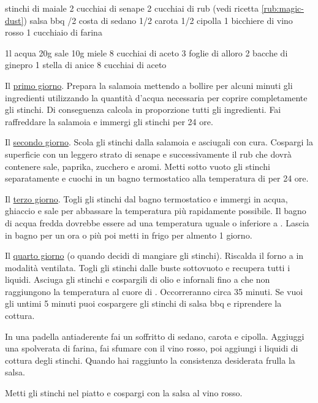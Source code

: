 \begin{ingreds}
	 stinchi di maiale
	2 cucchiai di senape
	2 cucchiai di rub (vedi ricetta \ref{rub:magic-dust})
	salsa bbq
	/2 costa di sedano
	1/2 carota
	1/2 cipolla
	1 bicchiere di vino rosso
	1 cucchiaio di farina

\columnbreak
	1l acqua
	20g sale
	10g miele
	8 cucchiai di aceto
	3 foglie di alloro
	2 bacche di ginepro
	1 stella di anice
	8 cucchiai di aceto
\end{ingreds}

\begin{method}
Il \underline{primo giorno}. Prepara la salamoia mettendo a bollire per alcuni minuti gli ingredienti utilizzando la quantità d'acqua necessaria per coprire completamente gli stinchi. Di conseguenza calcola in proporzione tutti gli ingredienti. Fai raffreddare la salamoia e immergi gli stinchi per 24 ore.

Il \underline{secondo giorno}. Scola gli stinchi dalla salamoia e asciugali con cura. Cospargi la superficie con un leggero strato di senape e successivamente il rub che dovrà contenere sale, paprika, zucchero e aromi. Metti sotto vuoto gli stinchi separatamente e cuochi in un bagno termostatico alla temperatura di  per 24 ore.

Il \underline{terzo giorno}. Togli gli stinchi dal bagno termostatico e immergi in acqua, ghiaccio e sale per abbassare la temperatura più rapidamente possibile. Il bagno di acqua fredda dovrebbe essere ad una temperatura uguale o inferiore a . Lascia in bagno per un ora o più poi metti in frigo per almento 1 giorno.

Il \underline{quarto giorno} (o quando decidi di mangiare gli stinchi). Riscalda il forno a  in modalità ventilata. Togli gli stinchi dalle buste sottovuoto e recupera tutti i liquidi. Asciuga gli stinchi e cospargili di olio e infornali fino a che non raggiungono la temperatura al cuore di . Occorreranno circa 35 minuti. Se vuoi gli untimi 5 minuti puoi cospargere gli stinchi di salsa bbq e riprendere la cottura.

In una padella antiaderente fai un soffritto di sedano, carota e cipolla. Aggiuggi una spolverata di farina, fai sfumare con il vino rosso, poi aggiungi i liquidi di cottura degli stinchi. Quando hai raggiunto la consistenza desiderata frulla la salsa.

Metti gli stinchi nel piatto e cospargi con la salsa al vino rosso.
\end {method}



